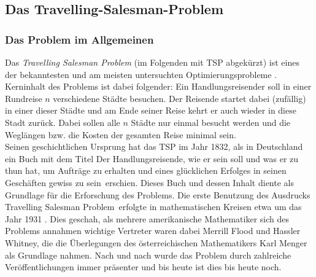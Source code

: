 \documentclass[doktyp=barbeit, sprache=german]{TUBAFarbeiten}
\begin{document}
\subsection{Das Travelling-Salesman-Problem}
\subsubsection{Das Problem im Allgemeinen}
Das \textit{Travelling Salesman Problem} (im Folgenden mit TSP abgekürzt) ist eines der bekanntesten und am meisten  untersuchten Optimierungsprobleme \cite{TaschenbuchAlgorithmen}. Kerninhalt des Problems ist dabei folgender: Ein Handlungsreisender soll in einer Rundreise \(n\) verschiedene Städte besuchen. Der Reisende startet dabei (zufällig) in einer dieser Städte und am Ende seiner Reise kehrt er auch wieder in diese Stadt zurück. Dabei sollen alle $n$ Städte nur einmal besucht werden und die Weglängen bzw. die Kosten der gesamten Reise minimal sein.
\\Seinen geschichtlichen Ursprung hat das TSP im Jahr 1832, als in Deutschland ein Buch mit dem Titel \glqq Der Handlungsreisende, wie er sein soll und was er zu thun hat, um Aufträge zu erhalten und eines glücklichen Erfolges in seinen Geschäften gewiss zu sein\grqq\, erschien. Dieses Buch und dessen Inhalt diente als Grundlage für die Erforschung des Problems. Die erste Benutzung des Ausdrucks \glqq Travelling Salesman Problem\grqq\, erfolgte in mathematischen Kreisen etwa um das Jahr 1931 \cite{TSP}. 
Dies geschah, als mehrere amerikanische Mathematiker sich des Problems annahmen \textendash{} wichtige Vertreter waren dabei Merrill Flood und Hassler Whitney, die die Überlegungen des österreichischen Mathematikers Karl Menger als Grundlage nahmen. Nach und nach wurde das Problem durch zahlreiche Veröffentlichungen immer präsenter und bis heute ist dies bis heute noch.
\end{document}
